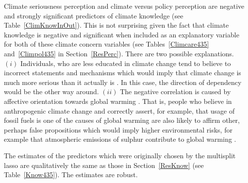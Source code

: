 \documentclass[a4paper,12pt]{article}
\begin{document}
Climate seriousness perception and climate versus policy perception are negative and strongly significant predictors of climate knowledge (see Table~\ref{ClimKnowInOut}). This is not surprising given the fact that climate knowledge is negative and significant when included as an explanatory variable for both of these climate concern variables (see Tables~\ref{Climcare435} and~\ref{Climpol435} in Section~\ref{ResPerc}). There are two possible explanations. $(i)$ Individuals, who are less educated in climate change tend to believe to incorrect statements and mechanisms which would imply that climate change is much more serious than it actually is \citep{reynolds2010now, WhatPplKnow94}. In this case, the direction of dependency would be the other way around. $(ii)$ The negative correlation is caused by affective orientation towards global warming \citep{Kahan2015}. That is, people who believe in anthropogenic climate change and correctly assert, for example, that usage of fossil fuels is one of the causes of global warming are also likely to affirm other, perhaps false propositions which would imply higher environmental risks, for example that atmospheric emissions of sulphur contribute to global warming \citep{reynolds2010now}.

The estimates of the predictors which were originally chosen by the multisplit lasso are qualitatively the same as those in Section~\ref{ResKnow} (see Table~\ref{Know435}). The estimates are robust.
\end{document}
